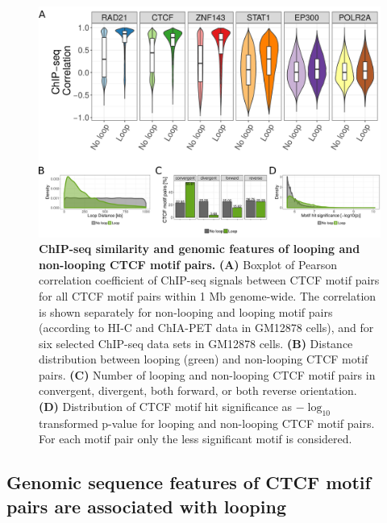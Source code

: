 \documentclass[a4paper,twoside=true,openright,parskip=full,chapterprefix=true,11pt,headings=normal,bibliography=totoc,listof=totoc,titlepage=on,captions=tableabove,draft=false]{scrreprt}
\theoremstyle{definition}
\theoremstyle{definition}
\theoremstyle{definition}
\theoremstyle{remark}
\begin{document}
\begin{figure}

{\centering \includegraphics[width=1\linewidth]{figures/loop_prediction/fig2_v04} 

}

\caption{\textbf{ChIP-seq similarity and genomic features of
looping and non-looping CTCF motif pairs.} \textbf{(A)} Boxplot of
Pearson correlation coefficient of ChIP-seq signals between CTCF motif
pairs for all CTCF motif pairs within 1 Mb genome-wide. The correlation
is shown separately for non-looping and looping motif pairs (according
to HI-C and ChIA-PET data in GM12878 cells), and for six selected
ChIP-seq data sets in GM12878 cells. \textbf{(B)} Distance distribution
between looping (green) and non-looping CTCF motif pairs. \textbf{(C)}
Number of looping and non-looping CTCF motif pairs in convergent,
divergent, both forward, or both reverse orientation. \textbf{(D)}
Distribution of CTCF motif hit significance as \(-\log_{10}\)
transformed p-value for looping and non-looping CTCF motif pairs. For
each motif pair only the less significant motif is considered.}\label{fig:LoopPred2}
\end{figure}















\hypertarget{genomic-sequence-features-of-ctcf-motif-pairs-are-associated-with-looping}{%
\subsection{Genomic sequence features of CTCF motif pairs are associated
with
looping}\label{genomic-sequence-features-of-ctcf-motif-pairs-are-associated-with-looping}}
\end{document}
